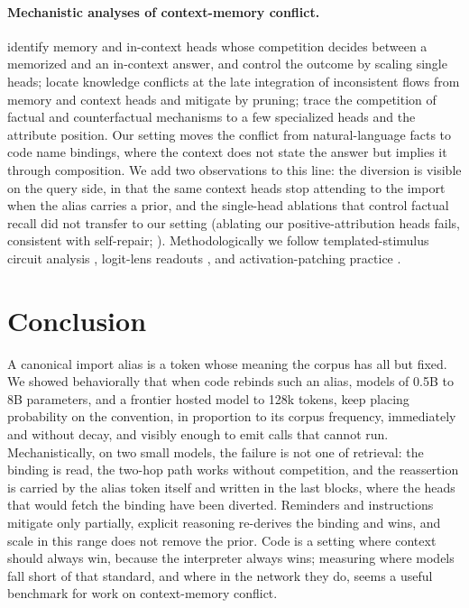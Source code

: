 \documentclass[11pt]{article}
\begin{document}
\paragraph{Mechanistic analyses of context-memory conflict.} \citet{yu2023characterizing} identify memory and in-context heads whose competition decides between a memorized and an in-context answer, and control the outcome by scaling single heads; \citet{jin2024cutting} locate knowledge conflicts at the late integration of inconsistent flows from memory and context heads and mitigate by pruning; \citet{ortu2024competition} trace the competition of factual and counterfactual mechanisms to a few specialized heads and the attribute position. Our setting moves the conflict from natural-language facts to code name bindings, where the context does not state the answer but implies it through composition. We add two observations to this line: the diversion is visible on the query side, in that the same context heads stop attending to the import when the alias carries a prior, and the single-head ablations that control factual recall did not transfer to our setting (ablating our positive-attribution heads fails, consistent with self-repair; \citealp{mcgrath2023hydra,rushing2024explorations}). Methodologically we follow templated-stimulus circuit analysis \citep{wang2023interpretability}, logit-lens readouts \citep{nostalgebraist2020interpreting,belrose2023eliciting,geva2022transformer}, and activation-patching practice \citep{zhang2024towards,heimersheim2024how}.

\section{Conclusion}

A canonical import alias is a token whose meaning the corpus has all but fixed. We showed behaviorally that when code rebinds such an alias, models of 0.5B to 8B parameters, and a frontier hosted model to 128k tokens, keep placing probability on the convention, in proportion to its corpus frequency, immediately and without decay, and visibly enough to emit calls that cannot run. Mechanistically, on two small models, the failure is not one of retrieval: the binding is read, the two-hop path works without competition, and the reassertion is carried by the alias token itself and written in the last blocks, where the heads that would fetch the binding have been diverted. Reminders and instructions mitigate only partially, explicit reasoning re-derives the binding and wins, and scale in this range does not remove the prior. Code is a setting where context should always win, because the interpreter always wins; measuring where models fall short of that standard, and where in the network they do, seems a useful benchmark for work on context-memory conflict.
\end{document}

